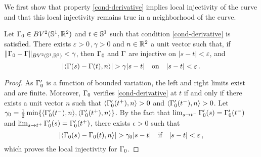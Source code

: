 We first show that property \eqref{cond-derivative} implies local injectivity of the curve and that this local injectivity remains true in a neighborhood of the curve.


\begin{prop}\label{open_condition}   
Let $\Gamma_0 \in BV^2(\mathbb{S}^1,\mathbb{R}^2) $ and $t \in \mathbb{S}^1$ such that condition \eqref{cond-derivative} is satisfied. There exists $\varepsilon>0 \, ,  \gamma>0$ and $n \in {\mathbb R}^2$ a unit vector such that,  if $\|\Gamma_0 - \Gamma \|_{BV^2(\mathbb{S}^1,\mathbb{R}^2) } < \gamma$, then $\Gamma_0$ and $\Gamma$ are injective on $|s-t|<\varepsilon$, and 
$$|\langle \Gamma(s) -\Gamma(t) ,n \rangle| > \gamma|s-t|\quad \mbox{on} \quad |s - t| < \varepsilon\,.$$
\end{prop}

\begin{proof}
As $\Gamma_0'$ is a function of bounded variation, the left and right limits exist and are finite. Moreover, $\Gamma_0$ verifies \eqref{cond-derivative} at $t$  if and only if there exists a  unit vector $n$ such that $\langle \Gamma_0'(t^+), n \rangle > 0$ and $\langle \Gamma_0'(t^-), n \rangle > 0$. 
Let $\gamma_0 = \frac 1 2 \min\{\langle \Gamma_0'(t^-), n \rangle ,\langle \Gamma_0'(t^+), n \rangle\}$. 
By the fact that $\lim_{s \to t^-} \Gamma_0'(s)= \Gamma_0'(t^-)$ and $\lim_{s \to t^+} \Gamma_0'(s)= \Gamma_0'(t^+)$, there exists $\epsilon>0$
such that 
$$|\langle \Gamma_0(s) -\Gamma_0(t) ,n \rangle| > \gamma_0|s-t|\quad \mbox{if} \quad |s - t| < \varepsilon\,,$$
which proves the local injectivity for $\Gamma_0$.


\end{proof}
